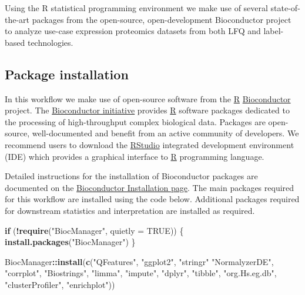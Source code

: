 \documentclass[9pt,a4paper,]{extarticle}
\newenvironment{Shaded}{\begin{snugshade}}{\end{snugshade}}
\newcommand{\AttributeTok}[1]{\textcolor[rgb]{0.13,0.29,0.53}{#1}}
\newcommand{\ConstantTok}[1]{\textcolor[rgb]{0.56,0.35,0.01}{#1}}
\newcommand{\ControlFlowTok}[1]{\textcolor[rgb]{0.13,0.29,0.53}{\textbf{#1}}}
\newcommand{\FunctionTok}[1]{\textcolor[rgb]{0.13,0.29,0.53}{\textbf{#1}}}
\newcommand{\NormalTok}[1]{#1}
\newcommand{\SpecialCharTok}[1]{\textcolor[rgb]{0.81,0.36,0.00}{\textbf{#1}}}
\newcommand{\StringTok}[1]{\textcolor[rgb]{0.31,0.60,0.02}{#1}}
\begin{document}
Using the R statistical programming environment \citep{Rstat} we make use of several
state-of-the-art packages from the open-source, open-development Bioconductor
project \citep{Huber2015} to analyze use-case expression proteomics datasets
\citep{HutchingsData} from both LFQ and label-based technologies.

\hypertarget{package-installation}{%
\subsection{Package installation}\label{package-installation}}

In this workflow we make use of open-source software from the
\href{https://www.r-project.org}{R} \href{https://bioconductor.org}{Bioconductor}
\citep{Huber2015} project. The \href{https://bioconductor.org}{Bioconductor initiative}
provides \href{https://www.r-project.org}{R} software packages dedicated
to the processing of high-throughput complex biological data. Packages are
open-source, well-documented and benefit from an active community of developers.
We recommend users to download the
\href{https://posit.co/download/rstudio-desktop/}{RStudio} integrated development
environment (IDE) which provides a graphical interface to
\href{https://www.r-project.org}{R} programming language.

Detailed instructions for the installation of Bioconductor packages are
documented on the \href{http://bioconductor.org/install/}{Bioconductor Installation page}.
The main packages required for this workflow are installed using the code below.
Additional packages required for downstream statistics and interpretation are
installed as required.

\begin{Shaded}
\begin{Highlighting}[]
\ControlFlowTok{if}\NormalTok{ (}\SpecialCharTok{!}\FunctionTok{require}\NormalTok{(}\StringTok{"BiocManager"}\NormalTok{, }\AttributeTok{quietly =} \ConstantTok{TRUE}\NormalTok{)) \{}
  \FunctionTok{install.packages}\NormalTok{(}\StringTok{"BiocManager"}\NormalTok{)}
\NormalTok{\}}

\NormalTok{BiocManager}\SpecialCharTok{::}\FunctionTok{install}\NormalTok{(}\FunctionTok{c}\NormalTok{(}\StringTok{"QFeatures"}\NormalTok{,}
                       \StringTok{"ggplot2"}\NormalTok{,}
                       \StringTok{"stringr"}
                       \StringTok{"NormalyzerDE"}\NormalTok{,}
                       \StringTok{"corrplot"}\NormalTok{,}
                       \StringTok{"Biostrings"}\NormalTok{,}
                       \StringTok{"limma"}\NormalTok{,}
                       \StringTok{"impute"}\NormalTok{,}
                       \StringTok{"dplyr"}\NormalTok{,}
                       \StringTok{"tibble"}\NormalTok{,}
                       \StringTok{"org.Hs.eg.db"}\NormalTok{,}
                       \StringTok{"clusterProfiler"}\NormalTok{,}
                       \StringTok{"enrichplot"}\NormalTok{))}
\end{Highlighting}
\end{Shaded}
\end{document}
